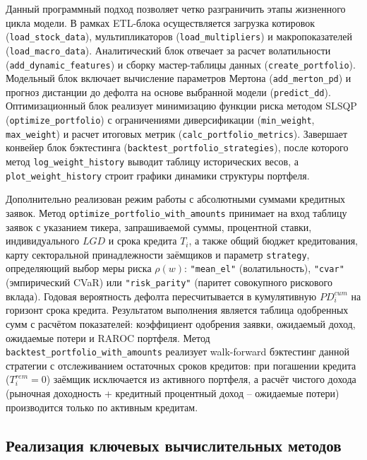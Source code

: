 \documentclass[]{article}
\begin{document}
	Данный программный подход позволяет четко разграничить этапы жизненного цикла модели. В рамках ETL-блока
	осуществляется загрузка котировок (\texttt{load\_stock\_data}), мультипликаторов (\texttt{load\_multipliers}) и
	макропоказателей (\texttt{load\_macro\_data}). Аналитический блок отвечает за расчет волатильности
	(\texttt{add\_dynamic\_features}) и сборку мастер-таблицы данных (\texttt{create\_portfolio}). Модельный блок включает
	вычисление параметров Мертона (\texttt{add\_merton\_pd}) и прогноз дистанции до дефолта на основе выбранной модели
	(\texttt{predict\_dd}). Оптимизационный блок реализует минимизацию
	функции риска методом SLSQP (\texttt{optimize\_portfolio}) с ограничениями диверсификации (\texttt{min\_weight},
	\texttt{max\_weight}) и расчет итоговых метрик (\texttt{calc\_portfolio\_metrics}). Завершает конвейер блок
	бэктестинга (\texttt{backtest\_portfolio\_strategies}), после которого метод \texttt{log\_weight\_history} выводит
	таблицу исторических весов, а \texttt{plot\_weight\_history} строит графики динамики структуры портфеля.

	Дополнительно реализован режим работы с абсолютными суммами кредитных заявок. Метод
	\texttt{optimize\_portfolio\_with\_amounts} принимает на вход таблицу заявок с указанием тикера,
	запрашиваемой суммы, процентной ставки, индивидуального $LGD$ и срока кредита $T_i$,
	а также общий бюджет кредитования, карту секторальной принадлежности заёмщиков и параметр
	\texttt{strategy}, определяющий выбор меры риска $\rho(w)$:
	\texttt{"mean\_el"} (волатильность), \texttt{"cvar"} (эмпирический CVaR) или
	\texttt{"risk\_parity"} (паритет совокупного рискового вклада).
	Годовая вероятность дефолта пересчитывается
	в кумулятивную $PD_i^{cum}$ на горизонт срока кредита. Результатом выполнения является таблица одобренных
	сумм с расчётом показателей: коэффициент одобрения заявки, ожидаемый доход, ожидаемые потери и
	RAROC портфеля. Метод \texttt{backtest\_portfolio\_with\_amounts} реализует walk-forward бэктестинг
	данной стратегии с отслеживанием остаточных сроков кредитов: при погашении кредита
	($T_i^{rem} = 0$) заёмщик исключается из активного портфеля, а расчёт чистого дохода
	(рыночная доходность + кредитный процентный доход -- ожидаемые потери) производится
	только по активным кредитам.

	\subsection{Реализация ключевых вычислительных методов}
\end{document}
